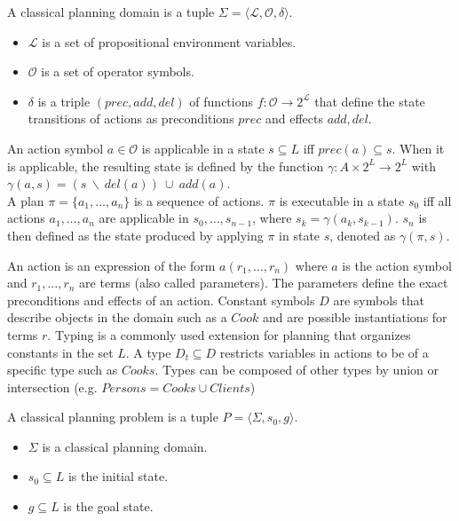 \begin{definition}
  A classical planning domain is a tuple $\Sigma=\langle \mathcal{L}, \mathcal{O}, \delta \rangle$.
  \begin{itemize}
    \item $\mathcal{L}$ is a set of propositional environment variables. 
    \item $\mathcal{O}$ is a set of operator symbols.
    \item $\delta$ is a triple $(prec, add, del )$ of functions $f: \mathcal{O} \rightarrow 2^\mathcal{L}$ that define the state transitions of actions as preconditions $prec$ and effects $add, del$.
  \end{itemize}
  An action symbol $a \in \mathcal{O}$ is \textnormal{applicable} in a state $s \subseteq L$ iff $prec(a) \subseteq s$.
  When it is \textnormal{applicable}, the resulting state is defined by the function $\gamma: A \times 2^L \rightarrow 2^L$ with $\gamma(a,s) = (s~\backslash~del(a))~\cup~add(a)$. \\
  A plan $\pi = \{a_1,\dots,a_n\}$ is a sequence of actions.
  $\pi$ is \textnormal{executable} in a state $s_0$ iff all actions $a_1,\dots,a_n$ are \textnormal{applicable} in $s_0,\dots,s_{n-1}$, where $s_k=\gamma(a_k,s_{k-1})$.
  $s_n$ is then defined as the state produced by applying $\pi$ in state $s$, denoted as $\gamma(\pi,s)$.
\end{definition}

An action is an expression of the form $a(r_1,\dots,r_n)$ where $a$ is the action symbol and $r_1,\dots,r_n$ are terms (also called parameters).
The parameters define the exact preconditions and effects of an action.
Constant symbols $D$ are symbols that describe objects in the domain such as a $Cook$ and are possible instantiations for terms $r$.
Typing is a commonly used extension for planning that organizes constants in the set $L$.
A type $D_t \subseteq D$ restricts variables in actions to be of a specific type such as $Cooks$.
Types can be composed of other types by union or intersection (e.g. $Persons=Cooks\cup Clients$)

\begin{definition}
  A classical planning problem is a tuple $P=\langle \Sigma, s_0, g \rangle$.
  \begin{itemize}
    \item $\Sigma$ is a classical planning domain.
    \item $s_0 \subseteq L$ is the initial state.
    \item $g \subseteq L$ is the goal state.
  \end{itemize}
\end{definition}

